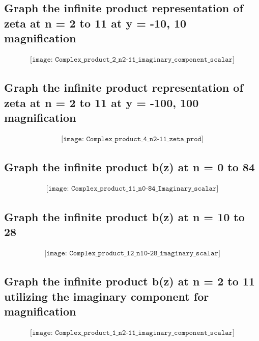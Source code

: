 \documentclass{article}
\begin{document}
\subsection*{Graph the infinite product representation of zeta at n = 2 to 11 at y = -10, 10 magnification}
\begin{align*}
\texttt{[image: Complex\_product\_2\_n2-11\_imaginary\_component\_scalar]}
\end{align*}

\subsection*{Graph the infinite product representation of zeta at n = 2 to 11 at y = -100, 100 magnification}
\begin{align*}
\texttt{[image: Complex\_product\_4\_n2-11\_zeta\_prod]}
\end{align*}

\subsection*{Graph the infinite product b(z) at n = 0 to 84}
\begin{align*}
\texttt{[image: Complex\_product\_11\_n0-84\_Imaginary\_scalar]}
\end{align*}

\subsection*{Graph the infinite product b(z) at n = 10 to 28}
\begin{align*}
\texttt{[image: Complex\_product\_12\_n10-28\_imaginary\_scalar]}
\end{align*}

\subsection*{Graph the infinite product b(z) at n = 2 to 11 utilizing the imaginary component for magnification}
\begin{align*}
\texttt{[image: Complex\_product\_1\_n2-11\_imaginary\_component\_scalar]}
\end{align*}
\end{document}

